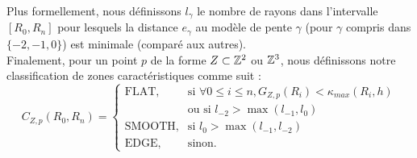 %
Plus formellement, nous définissons $l_{\gamma}$ le nombre de rayons dans
l'intervalle $[R_0,R_n]$ pour lesquels la distance $e_\gamma$ au modèle de pente
$\gamma$ (pour $\gamma$ compris dans $\{-2, -1, 0\}$) est minimale (comparé aux
autres).
%
\\
%
Finalement, pour un point $p$ de la forme $Z \subset \mathbb{Z}^2$ ou $\mathbb{Z}^3$, nous
définissons notre classification de zones caractéristiques comme suit :
%
\begin{equation}
 C_{Z,p}(R_0, R_n) =
  \begin{cases}
      \text{FLAT},         & \text{si } \forall 0 \leq i \leq n,    G_{Z,p}(R_i) < \kappa_{max}(R_i,h) \\
                           & \text{ou si } l_{-2} > \max( l_{-1}, l_{0} )\\
      \text{SMOOTH},       & \text{si } l_{0}> \max( l_{-1}, l_{-2} )\\
      \text{EDGE},        & \text{sinon.}
  \end{cases}
\end{equation}
%
